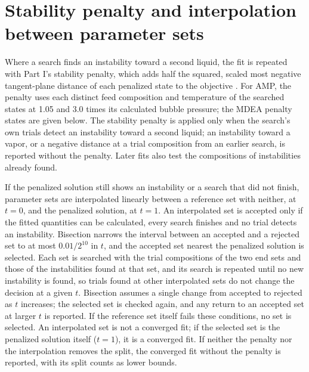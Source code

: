 \section{Stability penalty and interpolation between parameter sets}\label{sec:p2-s-retreat}
Where a search finds an instability toward a second liquid, the fit is repeated with Part I's stability penalty, which adds half the squared, scaled most negative tangent-plane distance of each penalized state to the objective \cite[Eq.~30]{PolleyPartI}.
For AMP, the penalty uses each distinct feed composition and temperature of the searched states at 1.05 and 3.0 times its calculated bubble pressure; the MDEA penalty states are given below.
The stability penalty is applied only when the search's own trials detect an instability toward a second liquid; an instability toward a vapor, or a negative distance at a trial composition from an earlier search, is reported without the penalty.
Later fits also test the compositions of instabilities already found.

If the penalized solution still shows an instability or a search that did not finish, parameter sets are interpolated linearly between a reference set with neither, at $t=0$, and the penalized solution, at $t=1$.
An interpolated set is accepted only if the fitted quantities can be calculated, every search finishes and no trial detects an instability.
Bisection narrows the interval between an accepted and a rejected set to at most $0.01/2^{10}$ in $t$, and the accepted set nearest the penalized solution is selected.
Each set is searched with the trial compositions of the two end sets and those of the instabilities found at that set, and its search is repeated until no new instability is found, so trials found at other interpolated sets do not change the decision at a given $t$.
Bisection assumes a single change from accepted to rejected as $t$ increases; the selected set is checked again, and any return to an accepted set at larger $t$ is reported.
If the reference set itself fails these conditions, no set is selected.
An interpolated set is not a converged fit; if the selected set is the penalized solution itself ($t=1$), it is a converged fit.
If neither the penalty nor the interpolation removes the split, the converged fit without the penalty is reported, with its split counts as lower bounds.

